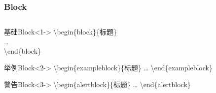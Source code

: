 \begin{frame}
    \frametitle{Block}
    \begin{columns}
        \begin{column}{0.94\textwidth}
            \begin{block}{基础Block}<1->
                \textbackslash begin\{block\}\{标题\}\\ \dots \\
                \textbackslash end\{block\}
            \end{block}
            \begin{exampleblock}{举例Block}<2->
                \textbackslash begin\{exampleblock\}\{标题\} \dots
                \textbackslash end\{exampleblock\}
            \end{exampleblock}
            \begin{alertblock}{警告Block}<3->
                \textbackslash begin\{alertblock\}\{标题\} \dots
                \textbackslash end\{alertblock\}
            \end{alertblock}
        \end{column}
        \begin{column}{0.06\textwidth}
        \end{column}
    \end{columns}
\end{frame}

